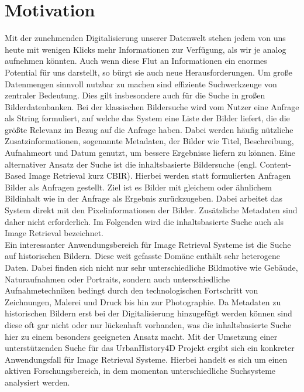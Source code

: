 \section*{Motivation}
Mit der zunehmenden Digitalisierung unserer Datenwelt stehen jedem von uns heute mit wenigen Klicks mehr Informationen zur Verfügung, als wir je analog aufnehmen könnten. Auch wenn diese Flut an Informationen ein enormes Potential für uns darstellt, so bürgt sie auch neue Herausforderungen. Um große Datenmengen sinnvoll nutzbar zu machen sind effiziente Suchwerkzeuge von zentraler Bedeutung. Dies gilt insbesondere auch für die Suche in großen Bilderdatenbanken. Bei der klassischen Bildersuche wird vom Nutzer eine Anfrage als String formuliert, auf welche das System eine Liste der Bilder liefert, die die größte Relevanz im Bezug auf die Anfrage haben. Dabei werden häufig nützliche  Zusatzinformationen, sogenannte Metadaten, der Bilder wie Titel, Beschreibung, Aufnahmeort und Datum genutzt, um bessere Ergebnisse liefern zu können. Eine alternativer Ansatz der Suche ist die inhaltsbasierte Bildersuche (engl. Content-Based Image Retrieval kurz CBIR). Hierbei werden statt formulierten Anfragen Bilder als Anfragen gestellt. Ziel ist es Bilder mit gleichem oder ähnlichem Bildinhalt wie in der Anfrage als Ergebnis zurückzugeben. Dabei arbeitet das System direkt mit den Pixelinformationen der Bilder. Zusätzliche Metadaten sind daher nicht erforderlich. Im Folgenden wird die inhaltsbasierte Suche auch als Image Retrieval bezeichnet.
\\
Ein interessanter Anwendungsbereich für Image Retrieval Systeme ist die Suche auf historischen Bildern. Diese weit gefasste Domäne enthält sehr heterogene Daten. Dabei finden sich nicht nur sehr unterschiedliche Bildmotive wie Gebäude, Naturaufnahmen oder Portraits, sondern auch unterschiedliche Aufnahmetechniken bedingt durch den technologischen Fortschritt von Zeichnungen, Malerei und Druck bis hin zur Photographie. Da Metadaten zu historischen Bildern erst bei der Digitalisierung hinzugefügt werden können sind diese oft gar nicht oder nur lückenhaft vorhanden, was die inhaltsbasierte Suche hier zu einem besonders geeigneten Ansatz macht. Mit der Umsetzung einer unterstützenden Suche für das UrbanHistory4D Projekt \cite{urbanhistory4d} ergibt sich ein konkreter Anwendungsfall für Image Retrieval Systeme. Hierbei handelt es sich um einen aktiven Forschungsbereich, in dem momentan unterschiedliche Suchsysteme analysiert werden. 
\\
